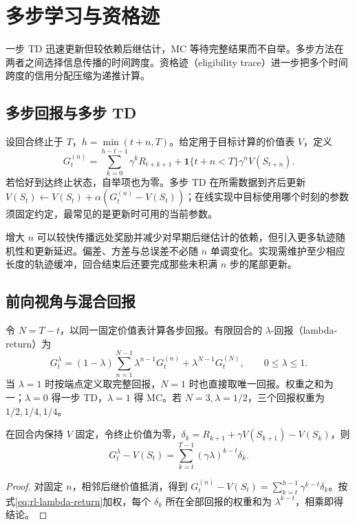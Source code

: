 \documentclass[UTF8,12pt,a4paper,fontset=fandol]{ctexbook}
\begin{document}
\chapter{多步学习与资格迹}
\label{ch:rl-multistep}

一步 TD 迅速更新但较依赖后继估计，MC 等待完整结果而不自举。多步方法在两者之间选择信息传播的时间跨度。资格迹（eligibility trace）进一步把多个时间跨度的信用分配压缩为递推计算。

\section{多步回报与多步 TD}

设回合终止于 $T$，$h=\min(t+n,T)$。给定用于目标计算的价值表 $V$，定义
\begin{equation}
G_t^{(n)}=\sum_{k=0}^{h-t-1}\gamma^kR_{t+k+1}
+\mathbf1\{t+n<T\}\gamma^nV(S_{t+n}).
\label{eq:rl-nstep-return}
\end{equation}
若恰好到达终止状态，自举项也为零。多步 TD 在所需数据到齐后更新 $V(S_t)\leftarrow V(S_t)+\alpha(G_t^{(n)}-V(S_t))$；在线实现中目标使用哪个时刻的参数须固定约定，最常见的是更新时可用的当前参数。

增大 $n$ 可以较快传播远处奖励并减少对早期后继估计的依赖，但引入更多轨迹随机性和更新延迟。偏差、方差与总误差不必随 $n$ 单调变化。实现需维护至少相应长度的轨迹缓冲，回合结束后还要完成那些未积满 $n$ 步的尾部更新。

\section{前向视角与混合回报}

令 $N=T-t$，以同一固定价值表计算各步回报。有限回合的 $\lambda$-回报（lambda-return）为
\begin{equation}
G_t^\lambda=(1-\lambda)\sum_{n=1}^{N-1}\lambda^{n-1}G_t^{(n)}
+\lambda^{N-1}G_t^{(N)},\qquad 0\leq\lambda\leq1.
\label{eq:rl-lambda-return}
\end{equation}
当 $\lambda=1$ 时按端点定义取完整回报，$N=1$ 时也直接取唯一回报。权重之和为一；$\lambda=0$ 得一步 TD，$\lambda=1$ 得 MC。若 $N=3,\lambda=1/2$，三个回报权重为 $1/2,1/4,1/4$。

\begin{proposition}[回报误差的残差展开]
在回合内保持 $V$ 固定，令终止价值为零，$\delta_k=R_{k+1}+\gamma V(S_{k+1})-V(S_k)$，则
\[
G_t^\lambda-V(S_t)=\sum_{k=t}^{T-1}(\gamma\lambda)^{k-t}\delta_k.
\]
\end{proposition}
\begin{proof}
对固定 $n$，相邻后继价值抵消，得到 $G_t^{(n)}-V(S_t)=\sum_{k=t}^{h-1}\gamma^{k-t}\delta_k$。按式\eqref{eq:rl-lambda-return}加权，每个 $\delta_k$ 所在全部回报的权重和为 $\lambda^{k-t}$，相乘即得结论。
\end{proof}
\end{document}

